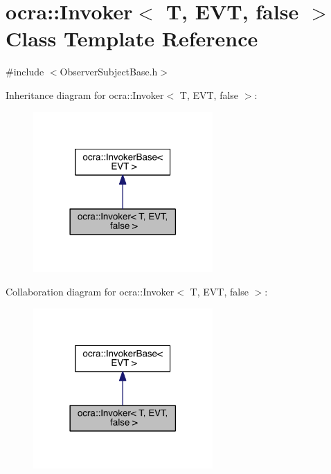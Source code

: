 \hypertarget{classocra_1_1Invoker_3_01T_00_01EVT_00_01false_01_4}{}\section{ocra\+:\+:Invoker$<$ T, E\+VT, false $>$ Class Template Reference}
\label{classocra_1_1Invoker_3_01T_00_01EVT_00_01false_01_4}


{\ttfamily \#include $<$Observer\+Subject\+Base.\+h$>$}



Inheritance diagram for ocra\+:\+:Invoker$<$ T, E\+VT, false $>$\+:\nopagebreak
\begin{figure}[H]
\begin{center}
\leavevmode
\includegraphics[width=194pt]{d4/dde/classocra_1_1Invoker_3_01T_00_01EVT_00_01false_01_4__inherit__graph}
\end{center}
\end{figure}


Collaboration diagram for ocra\+:\+:Invoker$<$ T, E\+VT, false $>$\+:\nopagebreak
\begin{figure}[H]
\begin{center}
\leavevmode
\includegraphics[width=194pt]{d7/d94/classocra_1_1Invoker_3_01T_00_01EVT_00_01false_01_4__coll__graph}
\end{center}
\end{figure}
